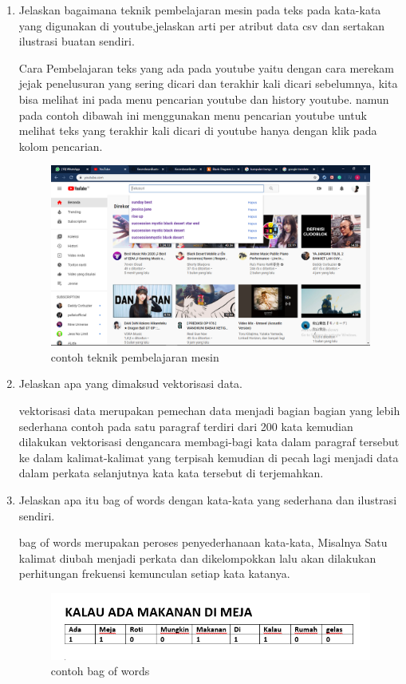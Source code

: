 \begin{enumerate}
\item Jelaskan bagaimana teknik pembelajaran mesin pada teks pada kata-kata yang digunakan di youtube,jelaskan arti per atribut data csv dan sertakan ilustrasi buatan sendiri.\par
Cara Pembelajaran teks yang ada pada youtube yaitu dengan cara merekam jejak penelusuran yang sering dicari dan terakhir kali dicari sebelumnya, kita bisa melihat ini pada menu pencarian youtube dan history youtube. namun pada contoh dibawah ini menggunakan menu pencarian youtube untuk melihat teks yang terakhir kali dicari di youtube hanya dengan klik pada kolom pencarian.

\begin{figure}[ht]
\centering
\includegraphics[scale=0.2]{figures/1174002/4/3.PNG}
\caption{contoh teknik pembelajaran mesin}
\label{contoh}
\end{figure}

\item Jelaskan apa yang dimaksud vektorisasi data.\par
vektorisasi data merupakan pemechan data menjadi bagian bagian yang lebih sederhana contoh pada satu paragraf terdiri dari 200 kata kemudian dilakukan vektorisasi dengancara membagi-bagi kata dalam paragraf tersebut ke dalam kalimat-kalimat yang terpisah kemudian di pecah lagi menjadi data dalam perkata selanjutnya kata kata tersebut di terjemahkan.

\item Jelaskan apa itu bag of words dengan kata-kata yang sederhana dan ilustrasi sendiri.\par
 bag of words merupakan peroses penyederhanaan kata-kata, Misalnya Satu kalimat diubah menjadi perkata dan dikelompokkan lalu akan dilakukan perhitungan frekuensi kemunculan setiap kata katanya.
\begin{figure}[ht]
\centering
\includegraphics[scale=0.2]{figures/1174002/4/4.PNG}
\caption{contoh bag of words}
\label{contoh}
\end{figure}


\end{enumerate}

